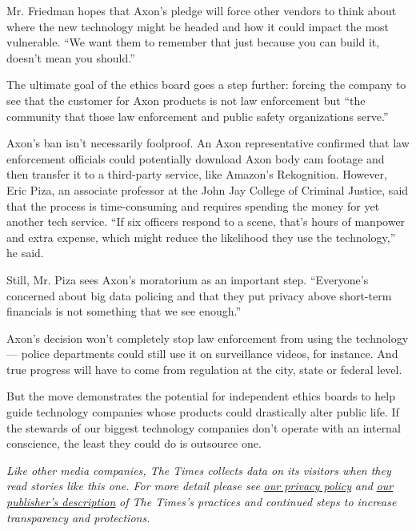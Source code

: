 Mr. Friedman hopes that Axon's pledge will force other vendors to think
about where the new technology might be headed and how it could impact
the most vulnerable. ``We want them to remember that just because you
can build it, doesn't mean you should.''

The ultimate goal of the ethics board goes a step further: forcing the
company to see that the customer for Axon products is not law
enforcement but ``the community that those law enforcement and public
safety organizations serve.''

Axon's ban isn't necessarily foolproof. An Axon representative confirmed
that law enforcement officials could potentially download Axon body cam
footage and then transfer it to a third-party service, like Amazon's
Rekognition. However, Eric Piza, an associate professor at the John Jay
College of Criminal Justice, said that the process is time-consuming and
requires spending the money for yet another tech service. ``If six
officers respond to a scene, that's hours of manpower and extra expense,
which might reduce the likelihood they use the technology,'' he said.

Still, Mr. Piza sees Axon's moratorium as an important step.
``Everyone's concerned about big data policing and that they put privacy
above short-term financials is not something that we see enough.''

Axon's decision won't completely stop law enforcement from using the
technology --- police departments could still use it on surveillance
videos, for instance. And true progress will have to come from
regulation at the city, state or federal level.

But the move demonstrates the potential for independent ethics boards to
help guide technology companies whose products could drastically alter
public life. If the stewards of our biggest technology companies don't
operate with an internal conscience, the least they could do is
outsource one.

\emph{Like other media companies, The Times collects data on its
visitors when they read stories like this one. For more detail please
see}
\href{https://help.nytimes3xbfgragh.onion/hc/en-us/articles/115014892108-Privacy-policy?module=inline}{\emph{our
privacy policy}} \emph{and}
\href{https://www.nytimes3xbfgragh.onion/2019/04/10/opinion/sulzberger-new-york-times-privacy.html?rref=collection\%2Fspotlightcollection\%2Fprivacy-project-does-privacy-matter\&action=click\&contentCollection=opinion\&region=stream\&module=stream_unit\&version=latest\&contentPlacement=8\&pgtype=collection}{\emph{our
publisher's description}} \emph{of The Times's practices and continued
steps to increase transparency and protections.}


